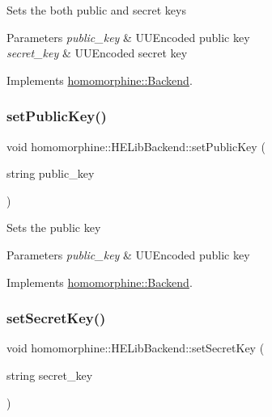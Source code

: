 Sets the both public and secret keys


\begin{DoxyParams}{Parameters}
{\em public\+\_\+key} & U\+U\+Encoded public key \\
\hline
{\em secret\+\_\+key} & U\+U\+Encoded secret key \\
\hline
\end{DoxyParams}


Implements \mbox{\hyperlink{classhomomorphine_1_1_backend_a48558b9cf1c143d92d83fa095dd84413}{homomorphine\+::\+Backend}}.

\mbox{\label{classhomomorphine_1_1_h_e_lib_backend_af54dc3990d99aab69c97172d0e5b4e51}} 
\subsubsection{\texorpdfstring{setPublicKey()}{setPublicKey()}}
{\footnotesize\ttfamily void homomorphine\+::\+H\+E\+Lib\+Backend\+::set\+Public\+Key (\begin{DoxyParamCaption}\item[{string}]{public\+\_\+key }\end{DoxyParamCaption})\hspace{0.3cm}{\ttfamily [virtual]}}

Sets the public key


\begin{DoxyParams}{Parameters}
{\em public\+\_\+key} & U\+U\+Encoded public key \\
\hline
\end{DoxyParams}


Implements \mbox{\hyperlink{classhomomorphine_1_1_backend_a7c1236495e4aa6481871852edfff327a}{homomorphine\+::\+Backend}}.

\mbox{\label{classhomomorphine_1_1_h_e_lib_backend_a483a6695be2d733d48e2180ffb25d053}} 
\subsubsection{\texorpdfstring{setSecretKey()}{setSecretKey()}}
{\footnotesize\ttfamily void homomorphine\+::\+H\+E\+Lib\+Backend\+::set\+Secret\+Key (\begin{DoxyParamCaption}\item[{string}]{secret\+\_\+key }\end{DoxyParamCaption})\hspace{0.3cm}{\ttfamily [virtual]}}

